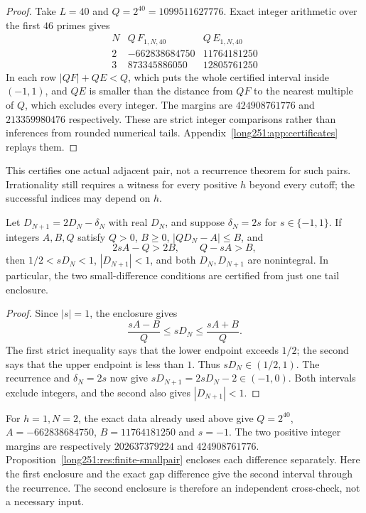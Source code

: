 \begin{proof}
Take $L=40$ and $Q=2^{40}=1099511627776$.  Exact integer arithmetic over the
first $46$ primes gives
\[
\begin{array}{c|r|r}
 N&Q\,F_{1,N,40}&Q\,E_{1,N,40}\\\hline
 2&-662838684750&11764181250\\
 3& 873345886050&12805761250
\end{array}
\]
In each row $|QF|+QE<Q$, which puts the whole certified interval inside
$(-1,1)$, and $QE$ is smaller than the distance from $QF$ to the nearest
multiple of $Q$, which excludes every integer.  The margins are $424908761776$
and $213359980476$ respectively.  These are strict integer comparisons rather
than inferences from rounded numerical tails.
Appendix~\ref{long251:app:certificates} replays them.
\end{proof}

This certifies one actual adjacent pair, not a recurrence theorem for
such pairs.  Irrationality still requires a witness for every positive
$h$ beyond every cutoff; the successful indices may depend on $h$.

\begin{proposition}\label{long251:res:one-tail-certificate}
Let $D_{N+1}=2D_N-\delta_N$ with real $D_N$, and suppose
$\delta_N=2s$ for $s\in\{-1,1\}$.  If integers $A,B,Q$ satisfy
$Q>0$, $B\ge0$, $|QD_N-A|\le B$, and
\[
 2sA-Q>2B,\qquad Q-sA>B,
\]
then $1/2<sD_N<1$, $|D_{N+1}|<1$, and both $D_N,D_{N+1}$ are
nonintegral.  In particular, the two small-difference conditions are certified from
just one tail enclosure.
\end{proposition}
\begin{proof}
Since $|s|=1$, the enclosure gives
\[
 \frac{sA-B}{Q}\le sD_N\le\frac{sA+B}{Q}.
\]
The first strict inequality says that the lower endpoint exceeds $1/2$;
the second says that the upper endpoint is less than $1$.
Thus $sD_N\in(1/2,1)$.  The recurrence and $\delta_N=2s$ now give
$sD_{N+1}=2sD_N-2\in(-1,0)$.  Both intervals exclude integers, and
the second also gives $|D_{N+1}|<1$.
\end{proof}
For $h=1,N=2$, the exact data already used above give
$Q=2^{40}$, $A=-662838684750$, $B=11764181250$ and $s=-1$.
The two positive integer margins are respectively
$202637379224$ and $424908761776$.
Proposition~\ref{long251:res:finite-smallpair} encloses each difference
separately.  Here the first enclosure and the exact gap difference give
the second interval through the recurrence.  The second enclosure is
therefore an independent cross-check, not a necessary input.

